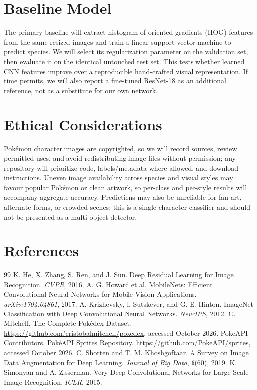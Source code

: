 \documentclass[final]{article}
\begin{document}
\section*{Baseline Model}
The primary baseline will extract histogram-of-oriented-gradients (HOG) features from the same resized images and train a linear support vector machine to predict species. We will select its regularization parameter on the validation set, then evaluate it on the identical untouched test set. This tests whether learned CNN features improve over a reproducible hand-crafted visual representation. If time permits, we will also report a fine-tuned ResNet-18 as an additional reference, not as a substitute for our own network.
\section*{Ethical Considerations}
Pok\'emon character images are copyrighted, so we will record sources, review permitted uses, and avoid redistributing image files without permission; any repository will prioritize code, labels/metadata where allowed, and download instructions. Uneven image availability across species and visual styles may favour popular Pok\'emon or clean artwork, so per-class and per-style results will accompany aggregate accuracy. Predictions may also be unreliable for fan art, alternate forms, or crowded scenes; this is a single-character classifier and should not be presented as a multi-object detector.
\newpage
\section*{References}
\begin{thebibliography}{99}
 K. He, X. Zhang, S. Ren, and J. Sun. Deep Residual Learning for Image Recognition. \emph{CVPR}, 2016.
 A. G. Howard et al. MobileNets: Efficient Convolutional Neural Networks for Mobile Vision Applications. \emph{arXiv:1704.04861}, 2017.
 A. Krizhevsky, I. Sutskever, and G. E. Hinton. ImageNet Classification with Deep Convolutional Neural Networks. \emph{NeurIPS}, 2012.
 C. Mitchell. The Complete Pok\'edex Dataset. \url{https://github.com/cristobalmitchell/pokedex}, accessed October 2026.
 PokeAPI Contributors. Pok\'eAPI Sprites Repository. \url{https://github.com/PokeAPI/sprites}, accessed October 2026.
 C. Shorten and T. M. Khoshgoftaar. A Survey on Image Data Augmentation for Deep Learning. \emph{Journal of Big Data}, 6(60), 2019.
 K. Simonyan and A. Zisserman. Very Deep Convolutional Networks for Large-Scale Image Recognition. \emph{ICLR}, 2015.
\end{thebibliography}
\end{document}
